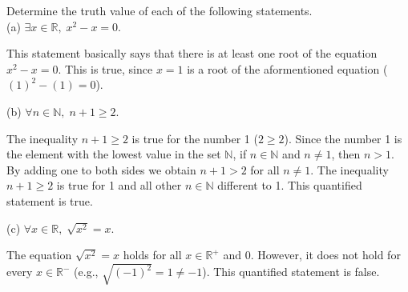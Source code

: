 \documentclass[12pt]{article}
\newcommand{\N}{\mathbb{N}}
\newenvironment{problem}[2][Problem]{\begin{trivlist}
		\item[\hskip \labelsep {\bfseries #1}\hskip \labelsep {\bfseries #2.}]}{\end{trivlist}}
\newenvironment{solution}[2][Solution]{\begin{trivlist}
		\item[\hskip \labelsep {\bfseries #1}\hskip \labelsep {\bfseries #2.}]}{\end{trivlist}}
\begin{document}
\begin{problem}{70}
	Determine the truth value of each of the following statements.\\
	
	(a) $\exists x \in \mathbb{R}, \; x^{2}-x=0.$  \\
	\begin{solution}{a}
	This statement basically says that there is at least one root of the equation $x^{2}-x=0$. This is true, since $x=1$ is a root of the aformentioned equation ($(1)^{2}-(1)=0$).\\
	\end{solution}
	
	(b) $\forall n \in \N, \; n+1 \geq 2.$\\
	\begin{solution}{b}
	The inequality $n+1 \geq 2$ is true for the number 1 ($2\geq2$). Since the number 1 is the element with the lowest value in the set $\N$, if $n\in \N$ and $n\neq 1$, then $n > 1$. By adding one to both sides we obtain $n + 1 > 2$ for all $n \neq 1$. The inequality $n+1 \geq 2$ is true for 1 and all other $n \in \N$ different to 1. This quantified statement is true.\\
	\end{solution}
	
	(c) $\forall x \in \mathbb{R}, \; \sqrt{x^{2}}=x.$\\
	\begin{solution}{c}
	The equation $\sqrt{x^{2}} = x$ holds for all $x \in \mathbb{R^{+}}$ and 0. However, it does not hold for every $x \in \mathbb{R^{-}}$ (e.g., $\sqrt{(-1)^{2}} = 1 \neq -1$). This quantified statement is false.\\
	\end{solution}
	

\end{problem}
\end{document}
